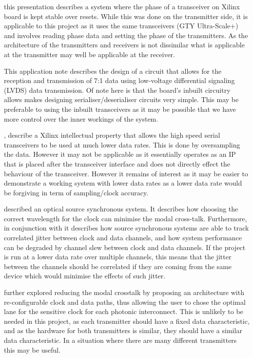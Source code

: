\noindent \cite{mendes_transceiver} this presentation describes a system where
the phase of a transceiver on Xilinx board is kept stable over resets. While
this was done on the transmitter side, it is applicable to this project as it
uses the same transceivers (GTY Ultra-Scale+) and involves reading phase data
and setting the phase of the transmitters. As the architecture of the
transmitters and receivers is not dissimilar what is applicable at the
transmitter may well be applicable at the receiver.

\noindent \cite{serdes}  This application note describes the design of 
a circuit that allows for the reception and transmission of 7:1 data using
low-voltage differential signaling (LVDS) data transmission. Of note here is
that the board's inbuilt circuitry allows makes designing serialiser/deserialiser
circuits very simple. This may be preferable to using the inbuilt transceivers
as it may be possible that we have more control over the inner workings of the
system.

\noindent \cite{dru_guide}, \cite{nidru} describe a Xilinx intellectual
property that allows the high speed serial transceivers to be used at much
lower data rates. This is done by oversampling the data. However it may not be
applicable as it essentially operates as an IP that is placed after the
transceiver interface and does not directly effect the behaviour of the
transceiver. However it remains of interest as it may be easier to demonstrate a
working system with lower data rates as a lower data rate would be forgiving in
term of sampling/clock accuracy.

\noindent \cite{williams2016source} described an optical source synchronous
system. It describes how choosing the correct wavelength for the clock can
minimise the modal cross-talk. Furthermore, in conjunction with
\cite{ragab2011receiver} it describes how source synchronous systems are able
to track correlated jitter between clock and data channels, and how system
performance can be degraded by channel slew between clock and data channels.
If the project is run at a lower data rate over multiple channels, this means
that the jitter between the channels should be correlated if they are coming
from the same device which would minimise the effects of such jitter.

\cleardoublepage

\noindent \cite{williams2019reconfiguration} further explored reducing the modal
crosstalk by proposing an architecture with re-configurable clock and data
paths, thus allowing the user to chose the optimal lane for the sensitive clock
for each photonic interconnect. This is unlikely to be needed in this project, as each
transmitter should have a fixed data characteristic, and as the hardware for
both transmitters is similar, they should have a similar data characteristic. 
In a situation where there are many different transmitters this may be useful.

